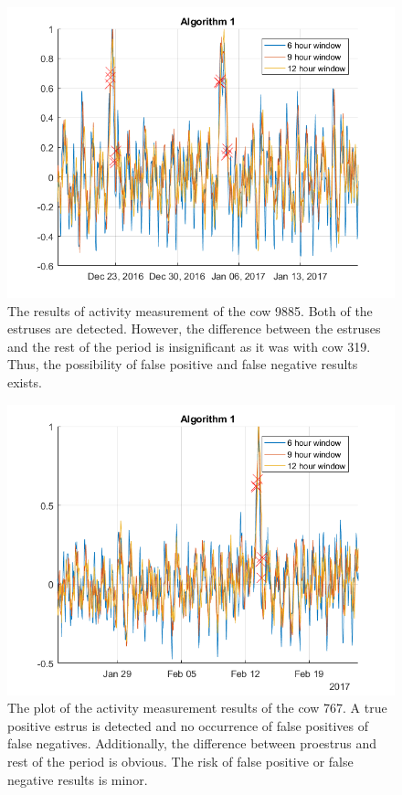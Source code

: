 \documentclass[english,12pt,a4paper,pdftex,elec,utf8]{aaltothesis}
\begin{document}
\begin{figure}[htb]
\centering
\includegraphics[width = 0.75 \textwidth]{figures/algorithm1_cow9885.png}
\caption{The results of activity measurement of the cow 9885. Both of the estruses are detected. However, the difference between the estruses and the rest of the period is insignificant as it was with cow 319. Thus, the possibility of false positive and false negative results exists.}
\label{algorithm1_cow9885}
\end{figure}


\begin{figure}[htb]
\centering
\includegraphics[width = 0.75 \textwidth]{figures/algorithm1_cow767}
\caption{The plot of the activity measurement results of the cow 767. A true positive estrus is detected and no occurrence of false positives of false negatives. Additionally, the difference between proestrus and rest of the period is obvious. The risk of false positive or false negative results is minor. }
\label{algorithm1_cow767}
\end{figure}
\end{document}
